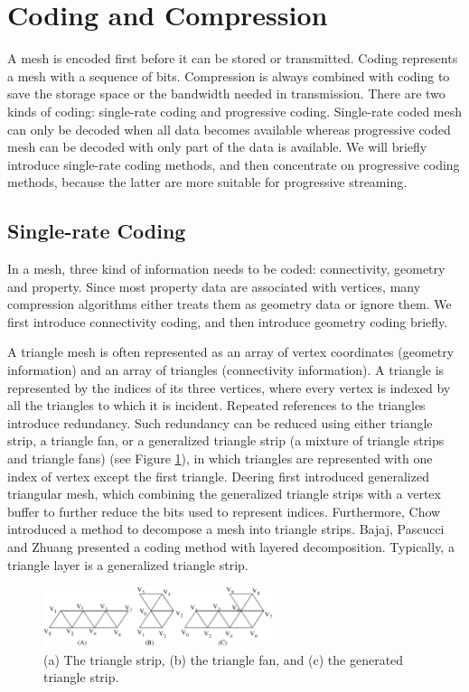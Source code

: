     \section{Coding and Compression}
    A mesh is encoded first before it can be stored or
    transmitted. Coding represents a mesh with a sequence of
    bits. Compression is always combined with coding to save the storage space
    or the bandwidth needed in transmission. 
    There are two kinds of coding:
    single-rate coding and progressive coding. 
    Single-rate coded mesh can only be decoded when all data becomes available 
    whereas progressive coded mesh can be decoded with only part of the data is available. 
    We will briefly introduce single-rate coding methods, and then concentrate on
    progressive coding methods, because the latter are more suitable for progressive streaming.
    
    \subsection{Single-rate Coding} \label{single_rate}
    In a mesh, three kind of information needs to be coded:
    connectivity, geometry and property. 
    Since most property data are associated with vertices, 
    many compression algorithms either treats them as geometry data or 
    ignore them. We first introduce connectivity coding, 
    and then introduce geometry coding briefly.
    
    A triangle mesh is often represented as an array of vertex coordinates
    (geometry information) and an array of triangles (connectivity information). 
    A triangle is represented by the indices of its three vertices,
    where every vertex is indexed by all the
    triangles to which it is incident. Repeated references to the triangles introduce
    redundancy. Such redundancy can be reduced using either 
    triangle strip, a triangle fan, or a
    generalized triangle strip (a mixture of triangle strips and
    triangle fans) (see Figure \ref{strip}), 
    in which triangles are represented with one index of vertex
    except the first triangle. 
    Deering \cite{218391} first introduced generalized triangular mesh, 
    which combining the generalized triangle strips with a vertex buffer
    to further reduce the bits used to represent indices. 
    Furthermore, Chow \cite{267103} introduced a method to
    decompose a mesh into triangle strips. 
    Bajaj, Pascucci and Zhuang \cite{789628} presented a coding method with layered
    decomposition. 
    Typically, a triangle layer is a generalized triangle strip. 
    \begin{figure}[ht]
    \centering
    \includegraphics[width=0.6\textwidth]{strip.eps}
    \caption{(a) The triangle strip, (b) the triangle fan, and (c) the generated triangle strip.}\label{strip}
    \end{figure}

